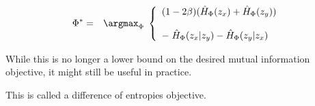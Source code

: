 {\vfill
{\huge
\begin{eqnarray*}
\Phi^* & = & \argmax_{\Phi} \; \left\{\begin{array}{l}(1-2\beta)(\hat{H}_{\Phi}(z_x)+ \hat{H}_{\Phi}(z_y)) \\
\\
-\; \hat{H}_{\Phi}(z_x|z_y) - \hat{H}_{\Phi}(z_y|z_x) \end{array}\right.
\end{eqnarray*}
}

\vfill
While this is no longer a lower bound on the desired mutual information objective, it might still be useful in practice.

\vfill
This is called a difference of entropies objective.


}


